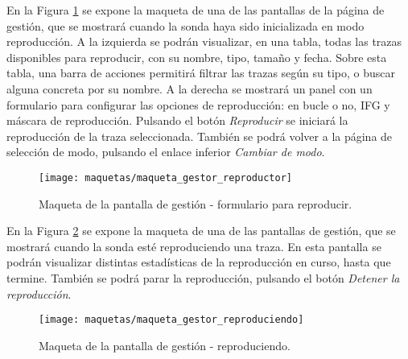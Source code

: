 En la Figura \ref{fig:maqueta:gestor_reproductor} se expone la maqueta de una de las pantallas de la página de gestión, que se mostrará cuando la sonda haya sido inicializada en modo reproducción.
A la izquierda se podrán visualizar, en una tabla, todas las \glspl{traza} disponibles para reproducir, con su nombre, tipo, tamaño y fecha.
Sobre esta tabla, una barra de acciones permitirá filtrar las \glspl{traza} según su tipo, o buscar alguna concreta por su nombre.
A la derecha se mostrará un panel con un formulario para configurar las opciones de reproducción: en bucle o no, \gls{IFG} y máscara de reproducción.
Pulsando el botón \textit{Reproducir} se iniciará la reproducción de la traza seleccionada.
También se podrá volver a la página de selección de modo, pulsando el enlace inferior \textit{Cambiar de modo}.
\begin{figure}[!htp]
  \centering
  \texttt{[image: maquetas/maqueta\_gestor\_reproductor]}
  \caption{Maqueta de la pantalla de gestión - formulario para reproducir.}
  \label{fig:maqueta:gestor_reproductor}
\end{figure}
\clearpage

En la Figura \ref{fig:maqueta:gestor_reproduciendo} se expone la maqueta de una de las pantallas de gestión, que se mostrará cuando la sonda esté reproduciendo una \gls{traza}.
En esta pantalla se podrán visualizar distintas estadísticas de la reproducción en curso, hasta que termine.
También se podrá parar la reproducción, pulsando el botón \textit{Detener la reproducción}.
\begin{figure}[!htp]
  \centering
  \texttt{[image: maquetas/maqueta\_gestor\_reproduciendo]}
  \caption{Maqueta de la pantalla de gestión - reproduciendo.}
  \label{fig:maqueta:gestor_reproduciendo}
\end{figure}